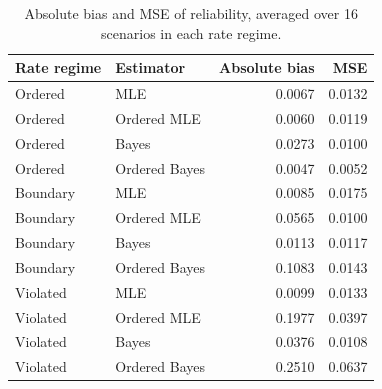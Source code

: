 \begin{table}[htbp]
\centering
\caption{Absolute bias and MSE of reliability, averaged over 16 scenarios in each rate regime.}\label{tab:points}
\small
\begin{tabular}{llrr}
\toprule
Rate regime & Estimator & Absolute bias & MSE \\
\midrule
Ordered & MLE & 0.0067 & 0.0132 \\
Ordered & Ordered MLE & 0.0060 & 0.0119 \\
Ordered & Bayes & 0.0273 & 0.0100 \\
Ordered & Ordered Bayes & 0.0047 & 0.0052 \\
Boundary & MLE & 0.0085 & 0.0175 \\
Boundary & Ordered MLE & 0.0565 & 0.0100 \\
Boundary & Bayes & 0.0113 & 0.0117 \\
Boundary & Ordered Bayes & 0.1083 & 0.0143 \\
Violated & MLE & 0.0099 & 0.0133 \\
Violated & Ordered MLE & 0.1977 & 0.0397 \\
Violated & Bayes & 0.0376 & 0.0108 \\
Violated & Ordered Bayes & 0.2510 & 0.0637 \\
\bottomrule
\end{tabular}
\end{table}
